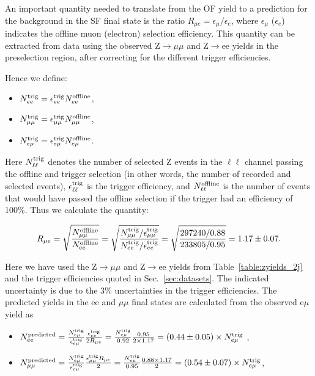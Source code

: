 An important quantity needed to translate from the OF yield to a prediction for the background in the SF final state is the ratio 
$R_{\mu e} = \epsilon_\mu / \epsilon_e$, where $\epsilon_\mu$ ($\epsilon_e$) indicates the offline muon (electron) selection efficiency. 
This quantity can be extracted from data using the observed Z$\to\mu\mu$ and Z$\to$ee yields in the preselection region, after correcting 
for the different trigger efficiencies.

Hence we define:

\begin{itemize}
\item $N_{ee}^{\rm{trig}} = \epsilon_{ee}^{\rm{trig}}N_{ee}^{\rm{offline}}$,
\item $N_{\mu\mu}^{\rm{trig}} = \epsilon_{\mu\mu}^{\rm{trig}}N_{\mu\mu}^{\rm{offline}}$,
\item $N_{e\mu}^{\rm{trig}} = \epsilon_{e\mu}^{\rm{trig}}N_{e\mu}^{\rm{offline}}$.
\end{itemize}
 
Here $N_{\ell\ell}^{\rm{trig}}$ denotes the number of selected Z events in the $\ell\ell$ channel passing the offline and trigger selection
(in other words, the number of recorded and selected events), $\epsilon_{\ell\ell}^{\rm{trig}}$ is the trigger efficiency, and 
$N_{\ell\ell}^{\rm{offline}}$ is the number of events that would have passed the offline selection if the trigger had an efficiency of 100\%.
Thus we calculate the quantity:

\begin{equation}
R_{\mu e} = \sqrt{\frac{N_{\mu\mu}^{\rm{offline}}}{N_{ee}^{\rm{offline}}}} = \sqrt{\frac{N_{\mu\mu}^{\rm{trig}}/\epsilon_{\mu\mu}^{\rm{trig}}}{N_{ee}^{\rm{trig}}/\epsilon_{ee}^{\rm{trig}}}} 
= \sqrt{\frac{297240/0.88}{233805/0.95}} = 1.17\pm0.07.
\end{equation}

Here we have used the Z$\to\mu\mu$ and Z$\to$ee yields from Table~\ref{table:zyields_2j} and the trigger efficiencies quoted in Sec.~\ref{sec:datasets}.
The indicated uncertainty is due to the 3\% uncertainties in the trigger efficiencies. %
The predicted yields in the ee and $\mu\mu$ final states are calculated from the observed e$\mu$ yield as

\begin{itemize}
\item $N_{ee}^{\rm{predicted}}    = \frac {N_{e\mu}^{\rm{trig}}} {\epsilon_{e\mu}^{\rm{trig}}} \frac {\epsilon_{ee}^{\rm{trig}}} {2 R_{\mu e}} 
= \frac{N_{e\mu}^{\rm{trig}}}{0.92}\frac{0.95}{2\times1.17} = (0.44\pm0.05) \times N_{e\mu}^{\rm{trig}}$ ,
\item $N_{\mu\mu}^{\rm{predicted}} = \frac {N_{e\mu}^{\rm{trig}}} {\epsilon_{e\mu}^{\rm{trig}}} \frac {\epsilon_{\mu\mu}^{\rm{trig}} R_{\mu e}}  {2}
= \frac {N_{e\mu}^{\rm{trig}}} {0.95} \frac {0.88 \times 1.17}{2} = (0.54\pm0.07) \times N_{e\mu}^{\rm{trig}}$,
\end{itemize}

